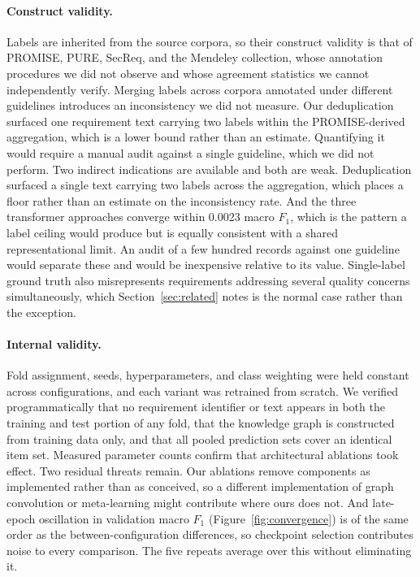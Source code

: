 \documentclass[11pt,a4paper]{article}
\begin{document}
\paragraph{Construct validity.}
Labels are inherited from the source corpora, so their construct validity is that of
PROMISE, PURE, SecReq, and the Mendeley collection, whose annotation procedures we did not
observe and whose agreement statistics we cannot independently verify. Merging labels
across corpora annotated under different guidelines introduces an inconsistency we did not measure. Our deduplication surfaced one requirement text carrying two labels within the
PROMISE-derived aggregation, which is a lower bound rather than an estimate. Quantifying it would require a manual audit against a single guideline, which we did not
perform. Two indirect indications are available and both are weak. Deduplication surfaced a
single text carrying two labels across the aggregation, which places a floor rather than an
estimate on the inconsistency rate. And the three transformer approaches converge within
0.0023 macro $F_1$, which is the pattern a label ceiling would produce but is equally
consistent with a shared representational limit. An audit of a few hundred records against
one guideline would separate these and would be inexpensive relative to its value. Single-label ground truth also
misrepresents requirements addressing several quality concerns simultaneously, which
Section~\ref{sec:related} notes is the normal case rather than the exception.

\paragraph{Internal validity.}
Fold assignment, seeds, hyperparameters, and class weighting were held constant across
configurations, and each variant was retrained from scratch. We verified programmatically
that no requirement identifier or text appears in both the training and test portion of any
fold, that the knowledge graph is constructed from training data only, and that all pooled
prediction sets cover an identical item set. Measured parameter counts confirm that
architectural ablations took effect. Two residual threats remain. Our ablations remove
components as implemented rather than as conceived, so a different implementation of graph
convolution or meta-learning might contribute where ours does not. And late-epoch
oscillation in validation macro $F_1$ (Figure~\ref{fig:convergence}) is of the same order
as the between-configuration differences, so checkpoint selection contributes noise to every comparison. The five repeats average over this without eliminating it.
\end{document}
